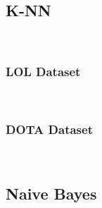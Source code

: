 \documentclass[a4paper,fleqn]{cas-sc}
\begin{document}
\subsection{K-NN}
 \\
\subsubsection{LOL Dataset}
 \\
\subsubsection{DOTA Dataset}
 \\
\subsection{Naive Bayes}
 \\
\end{document}
